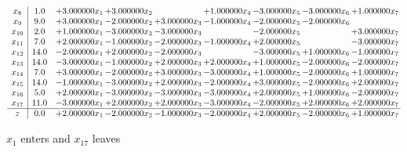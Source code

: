 \documentclass[10pt]{article}
\begin{document}
\[\begin{array}{c| c c@{\hskip 2pt} c@{\hskip 2pt} c@{\hskip 2pt} c@{\hskip 2pt} c@{\hskip 2pt} c@{\hskip 2pt} c@{\hskip 2pt} }
 x_{8}   &  1.0 & + 3.000000 x_{1} & + 3.000000 x_{2} &   & + 1.000000 x_{4} & -3.000000 x_{5} & -3.000000 x_{6} & + 1.000000 x_{7}\\
 x_{9}   &  9.0 & + 3.000000 x_{1} & -2.000000 x_{2} & + 3.000000 x_{3} & -1.000000 x_{4} & -2.000000 x_{5} & -2.000000 x_{6} &   \\
 x_{10}   &  2.0 & + 1.000000 x_{1} & -3.000000 x_{2} & -3.000000 x_{3} &   & -2.000000 x_{5} &   & + 3.000000 x_{7}\\
 x_{11}   &  7.0 & + 2.000000 x_{1} & -1.000000 x_{2} & -2.000000 x_{3} & -1.000000 x_{4} & + 2.000000 x_{5} &   & -3.000000 x_{7}\\
 x_{12}   &  14.0 & -2.000000 x_{1} & + 2.000000 x_{2} & -2.000000 x_{3} &   & -3.000000 x_{5} & + 1.000000 x_{6} & -1.000000 x_{7}\\
 x_{13}   &  14.0 & -3.000000 x_{1} & -1.000000 x_{2} & + 2.000000 x_{3} & + 2.000000 x_{4} & + 1.000000 x_{5} & -2.000000 x_{6} & -2.000000 x_{7}\\
 x_{14}   &  7.0 & + 3.000000 x_{1} & -2.000000 x_{2} & + 3.000000 x_{3} & -3.000000 x_{4} & + 1.000000 x_{5} & -2.000000 x_{6} & + 1.000000 x_{7}\\
 x_{15}   &  14.0 & -1.000000 x_{1} & -3.000000 x_{2} & + 2.000000 x_{3} & -2.000000 x_{4} & + 3.000000 x_{5} & -2.000000 x_{6} & + 2.000000 x_{7}\\
 x_{16}   &  5.0 & + 2.000000 x_{1} & -3.000000 x_{2} & -3.000000 x_{3} & -3.000000 x_{4} & + 2.000000 x_{5} & + 1.000000 x_{6} & -2.000000 x_{7}\\
 x_{17}   &  11.0 & -3.000000 x_{1} & + 2.000000 x_{2} & + 2.000000 x_{3} & -3.000000 x_{4} & -2.000000 x_{5} & + 2.000000 x_{6} & + 2.000000 x_{7}\\
\hline
z    &  0.0 & + 2.000000 x_{1} & -2.000000 x_{2} & -1.000000 x_{3} & -2.000000 x_{4} & + 2.000000 x_{5} & -2.000000 x_{6} & + 1.000000 x_{7}\\
\end{array}\]


 $ x_{1} $ enters and $ x_{17} $ leaves 
\end{document}
